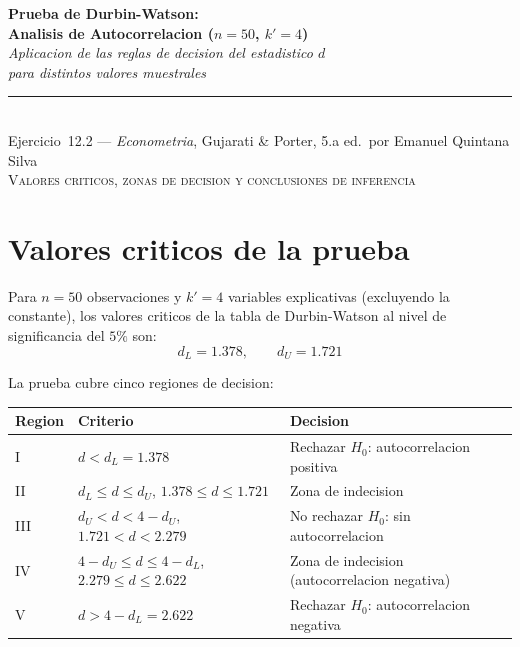 \documentclass[12pt, letterpaper]{article}
\begin{document}
\begin{center}
  {\LARGE\bfseries Prueba de Durbin-Watson:}\\[6pt]
  {\LARGE\bfseries Analisis de Autocorrelacion ($n=50$, $k'=4$)}\\[12pt]
  {\large\itshape Aplicacion de las reglas de decision del estadistico $d$}\\
  {\large\itshape para distintos valores muestrales}\\[14pt]
  \rule{0.55\linewidth}{0.6pt}\\[8pt]
  {\normalsize Ejercicio~12.2 --- \textit{Econometria}, Gujarati \& Porter, 5.a ed.\ por Emanuel Quintana Silva}\\[4pt]
  {\small\textsc{Valores criticos, zonas de decision y conclusiones de inferencia}}
\end{center}

\vspace{10pt}

\section{Valores criticos de la prueba}

Para $n = 50$ observaciones y $k' = 4$ variables explicativas (excluyendo la
constante), los valores criticos de la tabla de Durbin-Watson al nivel de
significancia del $5\%$ son:
\begin{equation}
  d_L = 1.378, \qquad d_U = 1.721
  \label{eq:criticos}
\end{equation}

La prueba cubre cinco regiones de decision:

\begin{center}
\renewcommand{\arraystretch}{1.3}
\small
\begin{tabular}{llp{6cm}}
\toprule
\textbf{Region} & \textbf{Criterio} & \textbf{Decision} \\
\midrule
I   & $d < d_L = 1.378$
    & Rechazar $H_0$: autocorrelacion positiva \\
II  & $d_L \le d \le d_U$, \; $1.378 \le d \le 1.721$
    & Zona de indecision \\
III & $d_U < d < 4 - d_U$, \; $1.721 < d < 2.279$
    & No rechazar $H_0$: sin autocorrelacion \\
IV  & $4-d_U \le d \le 4-d_L$, \; $2.279 \le d \le 2.622$
    & Zona de indecision (autocorrelacion negativa) \\
V   & $d > 4 - d_L = 2.622$
    & Rechazar $H_0$: autocorrelacion negativa \\
\bottomrule
\end{tabular}
\end{center}
\end{document}
